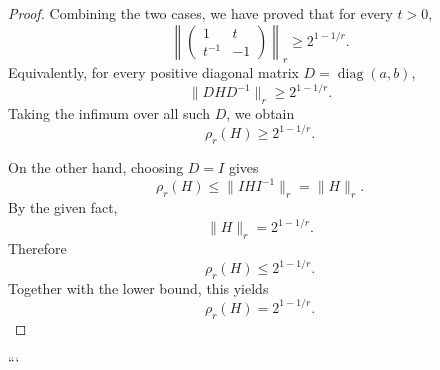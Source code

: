 \begin{proof}
Combining the two cases, we have proved that for every $t>0$,
\[
\left\|
\begin{pmatrix}
1 & t\\
t^{-1} & -1
\end{pmatrix}
\right\|_r
\geq
2^{1-1/r}.
\]
Equivalently, for every positive diagonal matrix $D=\operatorname{diag}(a,b)$,
\[
\|DHD^{-1}\|_r \geq 2^{1-1/r}.
\]
Taking the infimum over all such $D$, we obtain
\[
\rho_r(H)\geq 2^{1-1/r}.
\]

On the other hand, choosing $D=I$ gives
\[
\rho_r(H)
\leq
\|IHI^{-1}\|_r
=
\|H\|_r.
\]
By the given fact,
\[
\|H\|_r=2^{1-1/r}.
\]
Therefore
\[
\rho_r(H)\leq 2^{1-1/r}.
\]
Together with the lower bound, this yields
\[
\rho_r(H)=2^{1-1/r}.
\]
\end{proof}
```